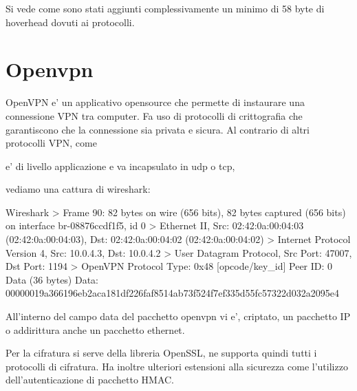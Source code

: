 Si vede come sono stati aggiunti complessivamente un minimo di 58 byte di hoverhead dovuti ai protocolli.




\section{Openvpn}



OpenVPN e' un applicativo opensource che permette di instaurare una connessione VPN tra computer. Fa uso di protocolli di crittografia che garantiscono che la connessione sia privata e sicura.
Al contrario di altri protocolli VPN, come %

e' di livello applicazione e va incapsulato in udp o tcp,

vediamo una cattura di wireshark:

\begin{bashcode}{Wireshark}{}
> Frame 90: 82 bytes on wire (656 bits), 82 bytes captured (656 bits) on interface br-08876ccdf1f5, id 0
> Ethernet II, Src: 02:42:0a:00:04:03 (02:42:0a:00:04:03), Dst: 02:42:0a:00:04:02 (02:42:0a:00:04:02)
> Internet Protocol Version 4, Src: 10.0.4.3, Dst: 10.0.4.2
> User Datagram Protocol, Src Port: 47007, Dst Port: 1194
> OpenVPN Protocol
        Type: 0x48 [opcode/key_id]
        Peer ID: 0
        Data (36 bytes)
            Data: 00000019a366196eb2aca181df226faf8514ab73f524f7ef335d55fc57322d032a2095e4
\end{bashcode}

All'interno del campo data del pacchetto openvpn vi e', criptato, un pacchetto IP o addirittura anche un pacchetto ethernet.

Per la cifratura si serve della libreria OpenSSL, ne supporta quindi tutti i protocolli di cifratura. Ha inoltre ulteriori estensioni alla sicurezza come l'utilizzo dell'autenticazione di pacchetto HMAC.

